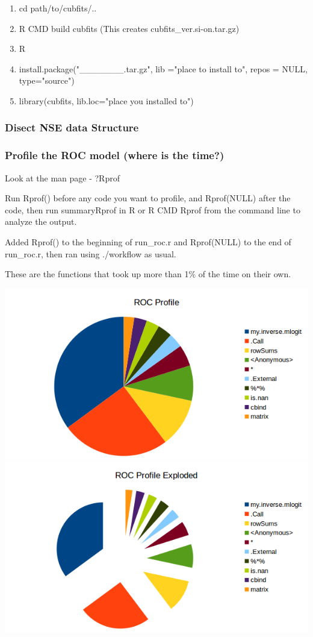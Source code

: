 \documentclass[11pt]{article} %
\begin{document}
\begin{enumerate}
\item cd path/to/cubfits/..
\item R CMD build cubfits (This creates cubfits\_ver.si-on.tar.gz)
\item R
\item install.package("\_\_\_\_\_\_\_.tar.gz", lib ="place to install to", repos = NULL, type="source")
\item library(cubfits, lib.loc="place you installed to")
\end{enumerate}


\subsubsection{Disect NSE data Structure}

\subsubsection{Profile the ROC model (where is the time?)}
Look at the man page - ?Rprof 

Run Rprof() before any code you want to profile, and Rprof(NULL) after the code, then run summaryRprof in R or R CMD Rprof from the command line to analyze the output. 

Added Rprof() to the beginning of run\_roc.r and Rprof(NULL) to the end of run\_roc.r, then ran using ./workflow as usual.

These are the functions that took up more than 1\% of the time on their own.


\includegraphics{data/ROC_Profile}
\includegraphics{data/ROC_Profilexplode}
\end{document}
